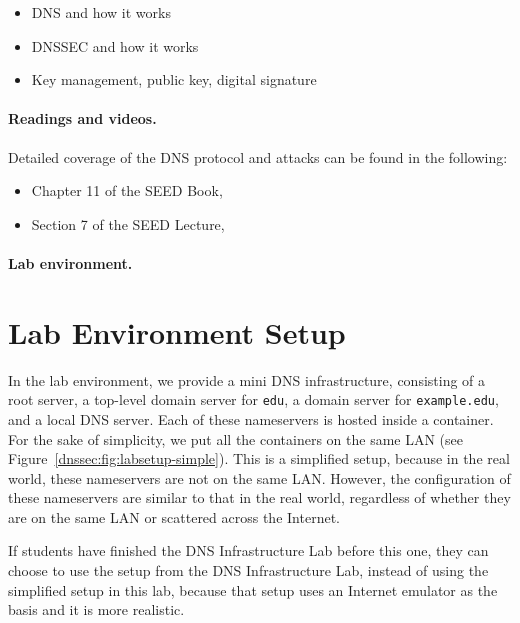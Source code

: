 \begin{itemize}[noitemsep]
\item DNS and how it works
\item DNSSEC and how it works
\item Key management, public key, digital signature 
\end{itemize}


\paragraph{Readings and videos.}
Detailed coverage of the DNS protocol and attacks can be found in the following:

\begin{itemize}
\item Chapter 11 of the SEED Book, \seedisbook
\item Section 7 of the SEED Lecture, \seedisvideo
\end{itemize}


\paragraph{Lab environment.} 
\seedenvironmentB
\nodependency

\section{Lab Environment Setup} 

In the lab environment, we provide a mini DNS infrastructure, consisting 
of a root server, a top-level domain server for \texttt{edu}, 
a domain server for \texttt{example.edu}, and a local DNS server. 
Each of these nameservers is hosted inside a container. 
For the sake of simplicity, we put all the containers on the same LAN (see 
Figure~\ref{dnssec:fig:labsetup-simple}). This is a simplified setup, 
because in the real world, these nameservers are not on the same LAN.
However, the configuration of these nameservers are similar to that in the 
real world, regardless of whether they are on the same LAN or scattered across
the Internet. 

If students have finished the DNS Infrastructure Lab before this one,
they can choose to use the setup from the DNS Infrastructure Lab, 
instead of using the simplified setup in this lab, 
because that setup uses an Internet emulator as the basis and it is more 
realistic. 

